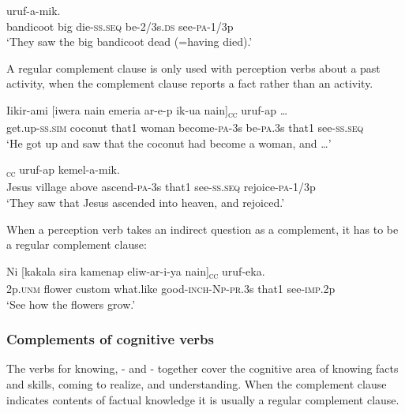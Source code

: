 \ea%
\label{ex:x1600}
  uruf-a-mik. \\
bandicoot  big  die-\textsc{ss}.\textsc{seq} be-2/3s.\textsc{ds}  see-\textsc{pa}-1/3p\\
\glt`They saw the big bandicoot dead (=having died).'
\z


A regular complement clause is only used with perception verbs about a past activity, when the complement clause reports a fact rather than an activity. 

\ea%
\label{ex:x1628}
\gll Iikir-ami  [iwera  nain  emeria  ar-e-p  ik-ua nain]\textsubscript{\textsc{cc}}  uruf-ap  {\dots}\\
get.up-\textsc{ss}.\textsc{sim} coconut that1 woman become-\textsc{pa}-3s be-\textsc{pa}.3s that1 see-\textsc{ss}.\textsc{seq}\\
\glt`He got up and saw that the coconut had become a woman, and {\dots}'
\z


\ea%
\label{ex:x1629}
\textsubscript{\textsc{cc}}  uruf-ap kemel-a-mik.\\
Jesus  village  above  ascend-\textsc{pa}-3s that1 see-\textsc{ss}.\textsc{seq} rejoice-\textsc{pa}-1/3p\\
\glt`They saw that Jesus ascended into heaven, and rejoiced.'
\z


When a perception verb takes an indirect question as a complement, it has to be a regular complement clause:

\ea%
\label{ex:x1631}
\gll Ni  [kakala  sira  kamenap  eliw-ar-i-ya  nain]\textsubscript{\textsc{cc}} uruf-eka.\\
2p.\textsc{unm} flower  custom  what.like  good-\textsc{inch}-\textsc{Np}-\textsc{pr}.3s that1 see-\textsc{imp}.2p\\
\glt`See how the flowers grow.'
\z


\subsubsection[Complements of cognitive verbs]{Complements of cognitive verbs}

The verbs for knowing, - and - together cover the cognitive area of knowing facts and skills, coming to realize, and understanding. When the complement clause indicates contents of factual knowledge it is usually a regular complement clause.

